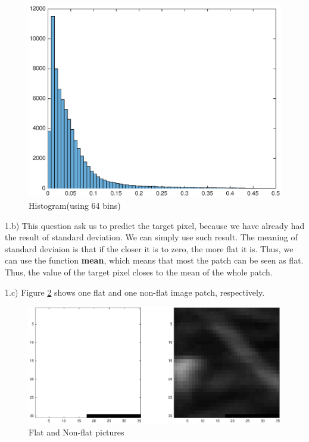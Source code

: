 \documentclass{article}
\begin{document}
\begin{figure}[H]
    \centering
    \includegraphics[keepaspectratio=true,width=\linewidth]{./pic/11a.eps} 
    \caption{Histogram(using 64 bins)}
    \label{fig:11a}
\end{figure}


1.b) This question ask us to predict the target pixel, because we have already had the result of standard deviation. We can simply use such result. The meaning of standard deviaion is that if the closer it is to zero, the more flat it is.
Thus, we can use the function \textbf{mean}, which means that most the patch can be seen as flat. Thus, the value of the target pixel closes to the mean of the whole patch.



1.c) Figure \ref{fig:11c} shows one flat and one non-flat image patch, respectively.



\begin{figure}[H]
    \centering
    \includegraphics[keepaspectratio=true,width=\linewidth]{./pic/11c.eps}
    \caption{Flat and Non-flat pictures}
    \label{fig:11c}
\end{figure}
\end{document}
